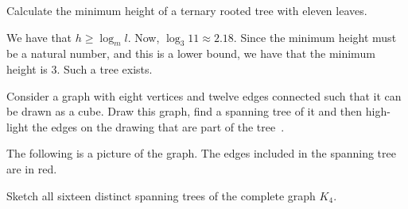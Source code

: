 \documentclass[a4paper, 12pt]{exam}
\begin{document}
\begin{questions}
\question
  Calculate the minimum height of a ternary rooted tree with eleven leaves.

  \begin{solution}
    We have that $h \geq \log_m l$.
    Now, $\log_3 11 \approx 2.18$.
    Since the minimum height must be a natural number, and this is a lower bound, we have that the minimum height is 3.
    Such a tree exists.
  \end{solution}


\question
  Consider a graph with eight vertices and twelve edges connected such that it can be drawn as a cube.
  Draw this graph, find a spanning tree of it and then high-light the edges on the drawing that are part of the tree~\cite{biggs02}.

  \begin{solution}
    The following is a picture of the graph.
    The edges included in the spanning tree are in red.
    \begin{center}
  	 \begin{adjustbox}{max width=0.6\textwidth}
			\end{adjustbox}
		\end{center}
  \end{solution}

\question
  Sketch all sixteen distinct spanning trees of the complete graph $K_4$.


\end{questions}
\end{document}
